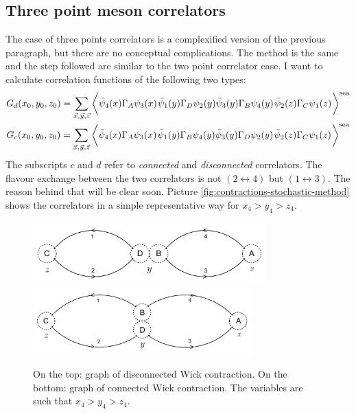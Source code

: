 \documentclass[english, LaM, oneside, noexaminfo]{sapthesis}
\begin{document}
\subsection*{Three point meson correlators}
\noindent
The case of three points correlators is a complexified version of the previous paragraph, but there are no conceptual complications.
The method is the same and the step followed are similar to the two point correlator case.
I want to calculate correlation functions of the following two types:
\begin{equation}\label{eq:GdGc-strategy}
    \begin{gathered}
        G_d(x_0,y_0,z_0) = \sum_{\vec x, \vec y, \vec z} \bigg\langle
        \bar\psi_4(x) \Gamma_A \psi_3 (x)\hspace*{.3mm}
        \bar\psi_1(y) \Gamma_D \psi_2 (y) \bar\psi_3(y) \Gamma_B \psi_4 (y)\hspace*{.3mm}
        \bar\psi_2(z) \Gamma_C \psi_1 (z)\hspace*{.3mm}
        \bigg\rangle^{\text{sea}}\\
        G_c(x_0,y_0,z_0) = \sum_{\vec x, \vec y, \vec z} \bigg\langle
        \bar\psi_4(x) \Gamma_A \psi_3 (x)\hspace*{.3mm}
        \bar\psi_1(y) \Gamma_B \psi_4 (y) \bar\psi_3(y) \Gamma_D \psi_2 (y)\hspace*{.3mm}
        \bar\psi_2(z) \Gamma_C \psi_1 (z)\hspace*{.3mm}
        \bigg\rangle^{\text{sea}}\\
    \end{gathered}
\end{equation}
The subscripts $c$ and $d$ refer to {\it connected} and {\it disconnected} correlators.
The flavour exchange between the two correlators is not $(2\leftrightarrow 4)$ but $(1\leftrightarrow 3)$.
The reason behind that will be clear soon.
Picture \ref{fig:contractions-stochastic-method} shows the correlators in a simple representative way for $x_4>y_4>z_4$.
\begin{figure}[h!]
    \centering
    \includegraphics[width=0.8\textwidth]{imgs-MSc-thesis/Wick_stochastic_disc.png}
    \includegraphics[width=0.75\textwidth]{imgs-MSc-thesis/Wick_stochastic_conn.png}
    \caption{On the top: graph of disconnected Wick contraction. On the bottom: graph of connected Wick contraction. The variables are such that $x_4 > y_4 > z_4$.}
\end{figure}\label{fig:contractions-stochastic-method}
\end{document}
